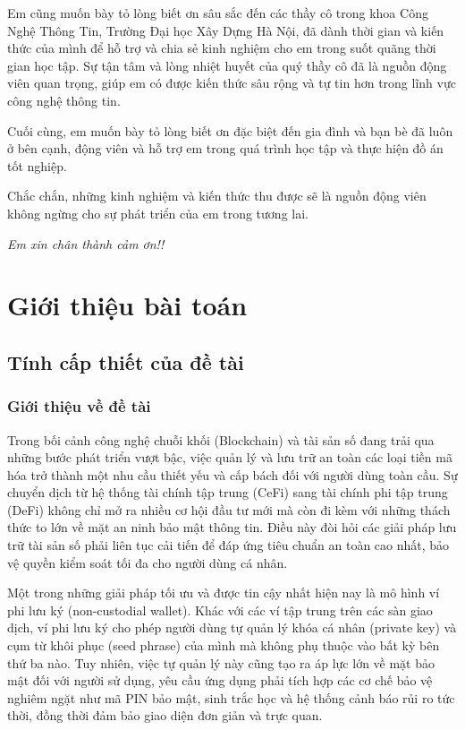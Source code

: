 \documentclass[a4paper]{report}
\begin{document}
\vspace{0.5cm}
Em cũng muốn bày tỏ lòng biết ơn sâu sắc đến các thầy cô trong khoa Công Nghệ Thông Tin, Trường Đại học Xây Dựng Hà Nội, đã dành thời gian và kiến thức của mình để hỗ trợ và chia sẻ kinh nghiệm cho em trong suốt quãng thời gian học tập. Sự tận tâm và lòng nhiệt huyết của quý thầy cô đã là nguồn động viên quan trọng, giúp em có được kiến thức sâu rộng và tự tin hơn trong lĩnh vực công nghệ thông tin.

\vspace{0.5cm}
Cuối cùng, em muốn bày tỏ lòng biết ơn đặc biệt đến gia đình và bạn bè đã luôn ở bên cạnh, động viên và hỗ trợ em trong quá trình học tập và thực hiện đồ án tốt nghiệp.

\vspace{0.5cm}
Chắc chắn, những kinh nghiệm và kiến thức thu được sẽ là nguồn động viên không ngừng cho sự phát triển của em trong tương lai.

\vspace{0.5cm}
\begin{flushright}
\textit{Em xin chân thành cảm ơn!!}
\end{flushright}
\newpage

\chapter{Giới thiệu bài toán}
\section{Tính cấp thiết của đề tài}
\subsection{Giới thiệu về đề tài}
Trong bối cảnh công nghệ chuỗi khối (Blockchain) và tài sản số đang trải qua những bước phát triển vượt bậc, việc quản lý và lưu trữ an toàn các loại tiền mã hóa trở thành một nhu cầu thiết yếu và cấp bách đối với người dùng toàn cầu. Sự chuyển dịch từ hệ thống tài chính tập trung (CeFi) sang tài chính phi tập trung (DeFi) không chỉ mở ra nhiều cơ hội đầu tư mới mà còn đi kèm với những thách thức to lớn về mặt an ninh bảo mật thông tin. Điều này đòi hỏi các giải pháp lưu trữ tài sản số phải liên tục cải tiến để đáp ứng tiêu chuẩn an toàn cao nhất, bảo vệ quyền kiểm soát tối đa cho người dùng cá nhân.

Một trong những giải pháp tối ưu và được tin cậy nhất hiện nay là mô hình ví phi lưu ký (non-custodial wallet). Khác với các ví tập trung trên các sàn giao dịch, ví phi lưu ký cho phép người dùng tự quản lý khóa cá nhân (private key) và cụm từ khôi phục (seed phrase) của mình mà không phụ thuộc vào bất kỳ bên thứ ba nào. Tuy nhiên, việc tự quản lý này cũng tạo ra áp lực lớn về mặt bảo mật đối với người sử dụng, yêu cầu ứng dụng phải tích hợp các cơ chế bảo vệ nghiêm ngặt như mã PIN bảo mật, sinh trắc học và hệ thống cảnh báo rủi ro tức thời, đồng thời đảm bảo giao diện đơn giản và trực quan.
\end{document}
